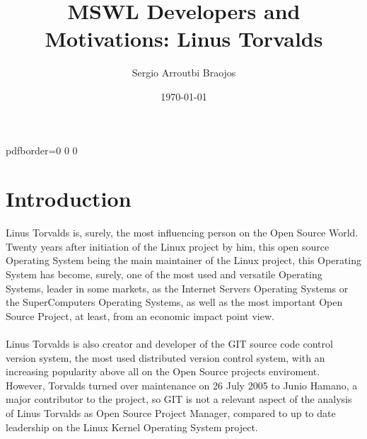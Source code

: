 \documentclass[11pt]{article}
\title{\textbf{MSWL Developers and Motivations: Linus Torvalds}}
\author{Sergio Arroutbi Braojos}
\date{\today}
\begin{document}
\hypersetup
{   
pdfborder={0 0 0}
}
   
\maketitle

\tableofcontents

\pagebreak

\section{Introduction}
Linus Torvalds is, surely, the most influencing person on the Open Source World. Twenty years after initiation of the Linux project by him, this open source Operating System being the main maintainer of the Linux project, this Operating System has become, surely, one of the most used and versatile Operating Systems, leader in some markets, as the Internet Servers Operating Systems or the SuperComputers Operating Systems, as well as the most important Open Source Project, at least, from an economic impact point view.\\
\\
Linus Torvalds is also creator and developer of the GIT source code control version system, the most used distributed version control system, with an increasing popularity above all on the Open Source projects enviroment. However, Torvalds turned over maintenance on 26 July 2005 to Junio Hamano, a major contributor to the project, so GIT is not a relevant aspect of the analysis of Linus Torvalds as Open Source Project Manager, compared to up to date leadership on the Linux Kernel Operating System project.
\end{document}
